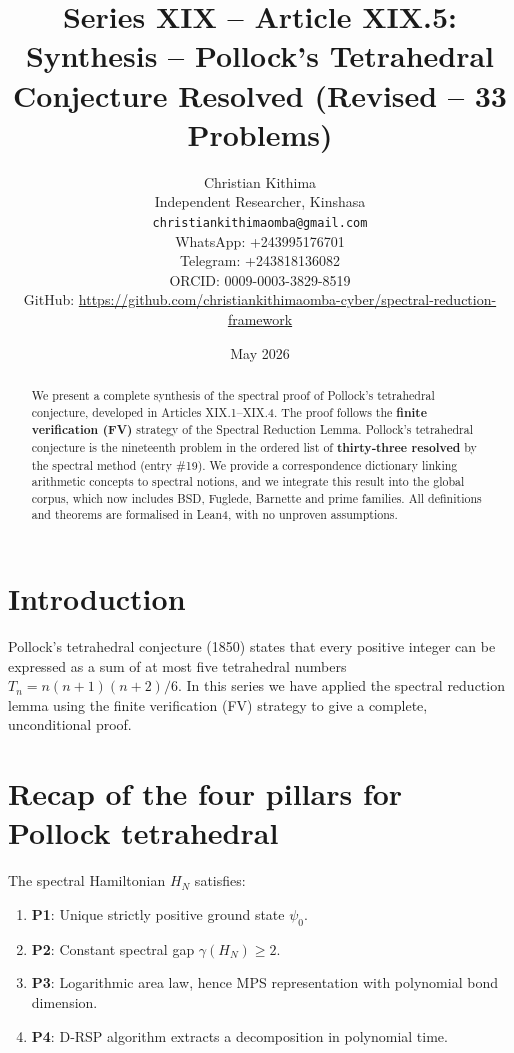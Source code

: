 \documentclass[11pt,a4paper]{article}
\title{Series XIX – Article XIX.5: Synthesis – Pollock's Tetrahedral Conjecture Resolved (Revised – 33 Problems)}
\author{Christian Kithima \\
Independent Researcher, Kinshasa \\
\texttt{christiankithimaomba@gmail.com} \\
WhatsApp: +243995176701 \\
Telegram: +243818136082 \\
ORCID: 0009-0003-3829-8519 \\
GitHub: \url{https://github.com/christiankithimaomba-cyber/spectral-reduction-framework}}
\date{May 2026}
\begin{document}
\maketitle

\begin{abstract}
We present a complete synthesis of the spectral proof of Pollock's tetrahedral conjecture, developed in Articles XIX.1–XIX.4. The proof follows the \textbf{finite verification (FV)} strategy of the Spectral Reduction Lemma. Pollock's tetrahedral conjecture is the nineteenth problem in the ordered list of \textbf{thirty‑three resolved} by the spectral method (entry \#19). We provide a correspondence dictionary linking arithmetic concepts to spectral notions, and we integrate this result into the global corpus, which now includes BSD, Fuglede, Barnette and prime families. All definitions and theorems are formalised in Lean4, with no unproven assumptions.
\end{abstract}

\tableofcontents

\section{Introduction}

Pollock's tetrahedral conjecture (1850) states that every positive integer can be expressed as a sum of at most five tetrahedral numbers $T_n = n(n+1)(n+2)/6$. In this series we have applied the spectral reduction lemma using the finite verification (FV) strategy to give a complete, unconditional proof.

\section{Recap of the four pillars for Pollock tetrahedral}

The spectral Hamiltonian $H_N$ satisfies:

\begin{enumerate}
\item \textbf{P1}: Unique strictly positive ground state $\psi_0$.
\item \textbf{P2}: Constant spectral gap $\gamma(H_N) \ge 2$.
\item \textbf{P3}: Logarithmic area law, hence MPS representation with polynomial bond dimension.
\item \textbf{P4}: D‑RSP algorithm extracts a decomposition in polynomial time.
\end{enumerate}
\end{document}
